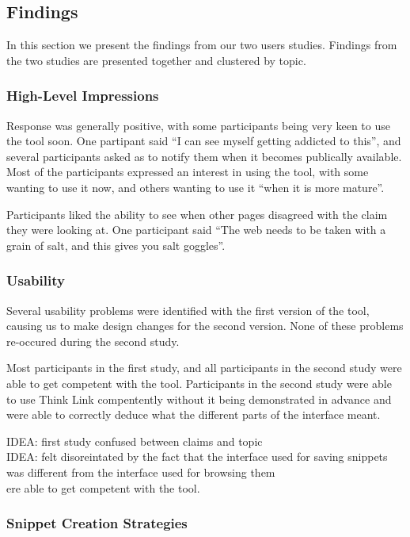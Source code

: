 \documentclass{chi2009}
\newcommand{\idea}[1]{{\color{blue} IDEA: #1}\\}
\begin{document}
\subsection{Findings}

In this section we present the findings from our two users studies. Findings from the two studies are presented together and clustered by topic.

\subsubsection{High-Level Impressions}

Response was generally positive, with some participants being very keen to use the tool soon. One partipant said ``I can see myself getting addicted to this'', and several participants asked as to notify them when it becomes publically available. Most of the participants expressed an interest in using the tool, with some wanting to use it now, and others wanting to use it ``when it is more mature''.

Participants liked the ability to see when other pages disagreed with the claim they were looking at. One participant said ``The web needs to be taken with a grain of salt, and this gives you salt goggles''.


\subsubsection{Usability}

Several usability problems were identified with the first version of the tool, causing us to make design changes for the second version. None of these problems re-occured during the second study. 

Most participants in the first study, and all participants in the second study were able to get competent with the tool. Participants in the second study were able to use Think Link compentently without it being demonstrated in advance and were able to correctly deduce what the different parts of the interface meant. 

\idea{first study confused between claims and topic}
\idea{felt disoreintated by the fact that the interface used for saving snippets was different from the interface used for browsing them}


ere able to get competent with the tool.


\subsubsection{Snippet Creation Strategies}
\end{document}
